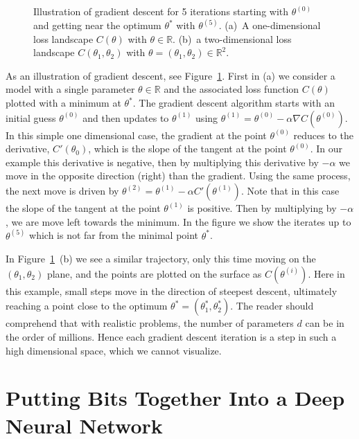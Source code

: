 \documentclass[12pt]{article}
\begin{document}
\begin{figure}[h!]
\begin{subfigure}[b]{0.5\linewidth}
    \caption{} 
    \vspace{2ex}
  \end{subfigure} 
    \caption{Illustration of gradient descent for 5 iterations starting with $\theta^{(0)}$ and getting near the optimum $\theta^*$ with $\theta^{(5)}$. (a)~A one-dimensional loss landscape $C(\theta)$ with $\theta \in \mathbb{R}$. (b)~a two-dimensional loss landscape $C(\theta_1,\theta_2)$ with $\theta = (\theta_1, \theta_2) \in \mathbb{R}^2$.}
    \label{simpleloss}
\end{figure}

As an illustration of gradient descent, see Figure~\ref{simpleloss}. First in (a) we consider a  model with a single parameter $\theta \in \mathbb{R}$ and the associated loss function $C(\theta)$ plotted with a minimum at $\theta^*$.  The gradient descent algorithm starts with an initial guess $\theta^{(0)}$ and then updates to $\theta^{(1)}$ using $\theta^{(1)} = \theta^{(0)} - \alpha \nabla C(\theta^{(0)})$. In this simple one dimensional case, the gradient at the point $\theta^{(0)}$ reduces to the derivative, $C'(\theta_0)$, which is the slope of the tangent at the point $\theta^{(0)}$. In our example this derivative is negative, then by multiplying this derivative by $-\alpha$ we move in the opposite direction (right) than the gradient. Using the same process, the next move is driven by $\theta^{(2)} = \theta^{(1)} - \alpha  C'(\theta^{(1)})$. Note that in this case the slope of the tangent at the point $\theta^{(1)}$ is positive. Then by multiplying by $- \alpha $, we are move left towards the minimum. In the figure we show the iterates up to $\theta^{(5)}$ which is not far from the minimal point $\theta^*$.

In Figure~\ref{simpleloss}~(b) we see a similar trajectory, only this time moving on the $(\theta_1, \theta_2)$ plane, and the points are plotted on the surface as $C(\theta^{(i)})$. Here in this example, small steps move in the direction of steepest descent, ultimately reaching a point close to the optimum $\theta^* = (\theta_1^*, \theta_2^*)$. The reader should comprehend that with realistic problems, the number of parameters $d$ can be in the order of millions. Hence each gradient descent iteration is a step in such a high dimensional space, which we cannot visualize. 


\section{Putting Bits Together Into a Deep Neural Network}
\label{sec:putting-bits-together}
\end{document}
